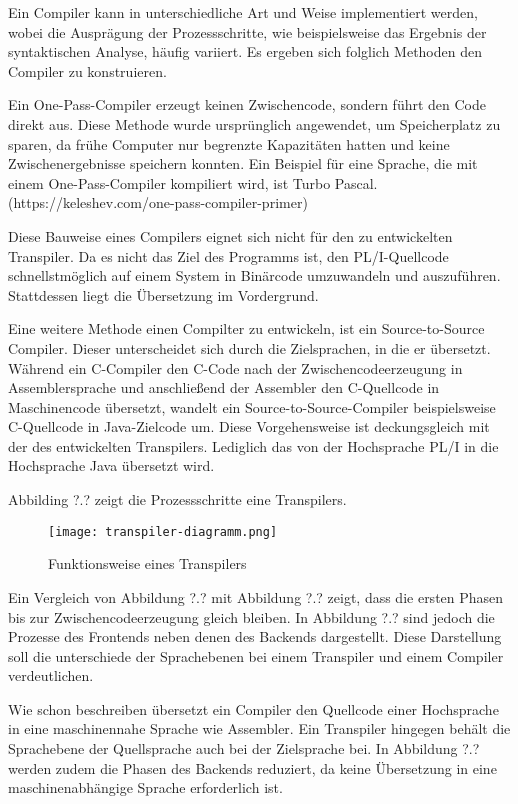 Ein Compiler kann in unterschiedliche Art und Weise implementiert werden, wobei die Ausprägung der Prozessschritte, wie beispielsweise das Ergebnis der syntaktischen Analyse, häufig variiert. Es ergeben sich folglich Methoden den Compiler zu konstruieren.

Ein One-Pass-Compiler erzeugt keinen Zwischencode, sondern führt den Code direkt aus. Diese Methode wurde ursprünglich angewendet, um Speicherplatz zu sparen, da frühe Computer nur begrenzte Kapazitäten hatten und keine Zwischenergebnisse speichern konnten. Ein Beispiel für eine Sprache, die mit einem One-Pass-Compiler kompiliert wird, ist Turbo Pascal. (https://keleshev.com/one-pass-compiler-primer)

Diese Bauweise eines Compilers eignet sich nicht für den zu entwickelten Transpiler. Da es nicht das Ziel des Programms ist, den PL/I-Quellcode schnellstmöglich auf einem System in Binärcode umzuwandeln und auszuführen. Stattdessen liegt die Übersetzung im Vordergrund.

Eine weitere Methode einen Compilter zu entwickeln, ist ein Source-to-Source Compiler.
Dieser unterscheidet sich durch die Zielsprachen, in die er übersetzt. Während ein C-Compiler den C-Code nach der Zwischencodeerzeugung in Assemblersprache und anschließend der Assembler den C-Quellcode in Maschinencode übersetzt, wandelt ein Source-to-Source-Compiler beispielsweise C-Quellcode in Java-Zielcode um. 
Diese Vorgehensweise ist deckungsgleich mit der des entwickelten Transpilers. Lediglich das von der Hochsprache PL/I in die Hochsprache Java übersetzt wird.

Abbilding ?.? zeigt die Prozessschritte eine Transpilers.

\pagebreak
\begin{figure}[h]
  \centering
  \caption{Funktionsweise eines Transpilers}
  \texttt{[image: transpiler-diagramm.png]}
  \label{fig:transpiler}
\end{figure}
\pagebreak

Ein Vergleich von Abbildung ?.? mit Abbildung ?.? zeigt, dass die ersten Phasen bis zur Zwischencodeerzeugung gleich bleiben. In Abbildung ?.? sind jedoch die Prozesse des Frontends neben denen des Backends dargestellt. Diese Darstellung soll die unterschiede der Sprachebenen bei einem Transpiler und einem Compiler verdeutlichen.

Wie schon beschreiben übersetzt ein Compiler den Quellcode einer Hochsprache in eine maschinennahe Sprache wie Assembler. Ein Transpiler hingegen behält die Sprachebene der Quellsprache auch bei der Zielsprache bei. In Abbildung ?.? werden zudem die Phasen des Backends reduziert, da keine Übersetzung in eine maschinenabhängige Sprache erforderlich ist.


